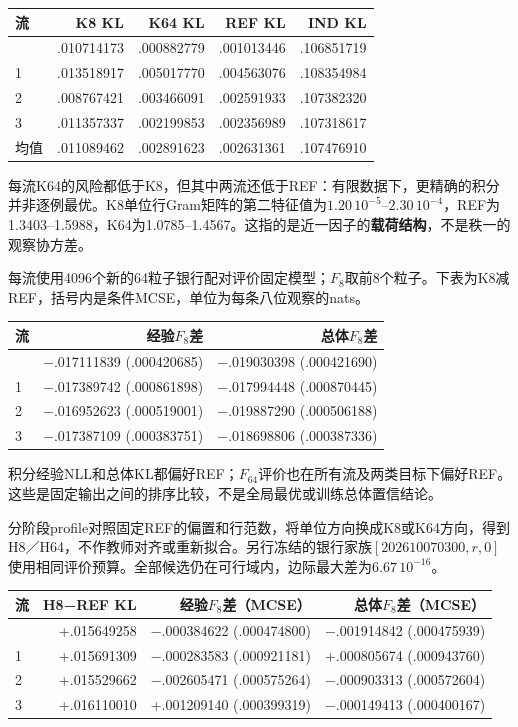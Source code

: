 \documentclass[11pt,a4paper]{article}
\begin{document}
\begin{longtable}[]{@{}lrrrr@{}}
\toprule\noalign{}
流 & K8 KL & K64 KL & REF KL & IND KL \\
\midrule\noalign{}
\endhead
\bottomrule\noalign{}
\endlastfoot
0 & .010714173 & .000882779 & .001013446 & .106851719 \\
1 & .013518917 & .005017770 & .004563076 & .108354984 \\
2 & .008767421 & .003466091 & .002591933 & .107382320 \\
3 & .011357337 & .002199853 & .002356989 & .107318617 \\
均值 & .011089462 & .002891623 & .002631361 & .107476910 \\
\end{longtable}

每流K64的风险都低于K8，但其中两流还低于REF：有限数据下，更精确的积分并非逐例最优。K8单位行Gram矩阵的第二特征值为\(1.20\,10^{-5}\)--\(2.30\,10^{-4}\)，REF为1.3403--1.5988，K64为1.0785--1.4567。这指的是近一因子的\textbf{载荷结构}，不是秩一的观察协方差。

每流使用4096个新的64粒子银行配对评价固定模型；\(F_8\)取前8个粒子。下表为K8减REF，括号内是条件MCSE，单位为每条八位观察的nats。

\begin{longtable}[]{@{}lrr@{}}
\toprule\noalign{}
流 & 经验\(F_8\)差 & 总体\(F_8\)差 \\
\midrule\noalign{}
\endhead
\bottomrule\noalign{}
\endlastfoot
0 & −.017111839 (.000420685) & −.019030398 (.000421690) \\
1 & −.017389742 (.000861898) & −.017994448 (.000870445) \\
2 & −.016952623 (.000519001) & −.019887290 (.000506188) \\
3 & −.017387109 (.000383751) & −.018698806 (.000387336) \\
\end{longtable}

积分经验NLL和总体KL都偏好REF；\(F_{64}\)评价也在所有流及两类目标下偏好REF。这些是固定输出之间的排序比较，不是全局最优或训练总体置信结论。

分阶段profile对照固定REF的偏置和行范数，将单位方向换成K8或K64方向，得到H8／H64，不作教师对齐或重新拟合。另行冻结的银行家族\([202610070300,r,0]\)使用相同评价预算。全部候选仍在可行域内，边际最大差为\(6.67\,10^{-16}\)。

\begin{longtable}[]{@{}lrrr@{}}
\toprule\noalign{}
流 & H8−REF KL & 经验\(F_8\)差（MCSE） & 总体\(F_8\)差（MCSE） \\
\midrule\noalign{}
\endhead
\bottomrule\noalign{}
\endlastfoot
0 & +.015649258 & −.000384622 (.000474800) & −.001914842 (.000475939) \\
1 & +.015691309 & −.000283583 (.000921181) & +.000805674 (.000943760) \\
2 & +.015529662 & −.002605471 (.000575264) & −.000903313 (.000572604) \\
3 & +.016110010 & +.001209140 (.000399319) & −.000149413 (.000400167) \\
\end{longtable}
\end{document}
